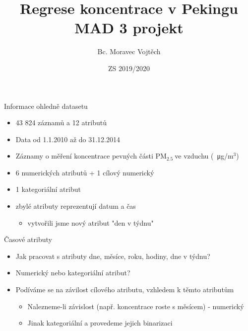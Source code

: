 \documentclass{beamer}%
\author{Bc. Moravec Vojtěch}
\title{Regrese koncentrace \pmQuant v Pekingu \\ MAD 3 projekt}
\date{ZS 2019/2020}
\institute{Vysoká škola báňská – Technická univerzita Ostrava}
\newcommand{\pmQuant}[0]{$\text{PM}_{2.5}\:$}
\begin{document}
\maketitle
\begin{frame}{Informace ohledně datasetu}
    \begin{itemize}
        \item 43 824 záznamů a 12 atributů
        \item Data od 1.1.2010 až do 31.12.2014
        \item Záznamy o měření koncentrace pevných části \pmQuant ve vzduchu (\SI{}{\micro\gram}/$\text{m}^3$)
        \item 6 numerických atributů + 1 cílový numerický
        \item 1 kategoriální atribut
        \item zbylé atributy reprezentují datum a čas
        \begin{itemize}
            \item vytvořili jsme nový atribut "den v týdnu"
        \end{itemize}
    \end{itemize}
\end{frame}
\begin{frame}{Časové atributy}
    \begin{itemize}
        \item Jak pracovat s atributy dne, měsíce, roku, hodiny, dne v týdnu?
        \item Numerický nebo kategoriální atribut?
        \item Podíváme se na závilost cílového atributu, vzhledem k těmto atributům
        \begin{itemize}
            \item Nalezneme-li závislost (např. koncentrace roste s měsícem) - numerický
            \item Jinak kategoriální a provedeme jejich binarizaci
        \end{itemize}
    \end{itemize}
\end{frame}
\end{document}
